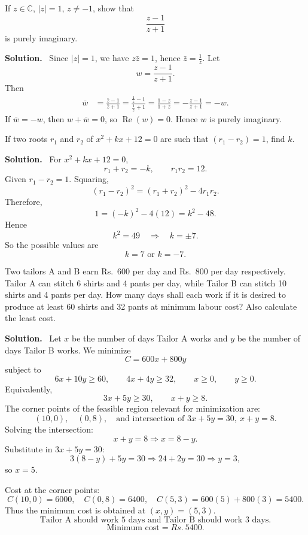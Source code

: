 \documentclass[11pt,a4paper]{article}
\newcommand{\question}[2]{\begin{tcolorbox}[breakable,colback=gray!5,colframe=black!35,title=\textbf{Question #1}]#2\end{tcolorbox}}
\newcommand{\answer}{\textbf{Solution.}\ }
\newcommand{\C}{\mathbb{C}}
\newcommand{\Rs}{Rs.}
\begin{document}
\question{1(e)}{If $z\in\C$, $|z|=1$, $z\ne -1$, show that
\[
\frac{z-1}{z+1}
\]
is purely imaginary.}
\answer
Since $|z|=1$, we have $z\bar z=1$, hence $\bar z=\frac1z$. Let
\[
w=\frac{z-1}{z+1}.
\]
Then
\begin{align*}
\bar w&=\frac{\bar z-1}{\bar z+1}
=\frac{\frac1z-1}{\frac1z+1}
=\frac{1-z}{1+z}
=-\frac{z-1}{z+1}=-w.
\end{align*}
If $\bar w=-w$, then $w+\bar w=0$, so $\operatorname{Re}(w)=0$. Hence $w$ is purely imaginary.

\question{1(f)}{If two roots $r_1$ and $r_2$ of $x^2+kx+12=0$ are such that $(r_1-r_2)=1$, find $k$.}
\answer
For $x^2+kx+12=0$,
\[
r_1+r_2=-k,\qquad r_1r_2=12.
\]
Given $r_1-r_2=1$. Squaring,
\[
(r_1-r_2)^2=(r_1+r_2)^2-4r_1r_2.
\]
Therefore,
\[
1=(-k)^2-4(12)=k^2-48.
\]
Hence
\[
k^2=49\quad\Rightarrow\quad k=\pm 7.
\]
So the possible values are
\[
\boxed{k=7\text{ or }k=-7.}
\]

\question{1(g)}{Two tailors A and B earn \Rs\ 600 per day and \Rs\ 800 per day respectively. Tailor A can stitch 6 shirts and 4 pants per day, while Tailor B can stitch 10 shirts and 4 pants per day. How many days shall each work if it is desired to produce at least 60 shirts and 32 pants at minimum labour cost? Also calculate the least cost.}
\answer
Let $x$ be the number of days Tailor A works and $y$ be the number of days Tailor B works. We minimize
\[
C=600x+800y
\]
subject to
\[
6x+10y\ge 60,
\qquad 4x+4y\ge 32,
\qquad x\ge0,
\qquad y\ge0.
\]
Equivalently,
\[
3x+5y\ge30,
\qquad x+y\ge8.
\]
The corner points of the feasible region relevant for minimization are:
\[
(10,0),\quad (0,8),\quad \text{and intersection of }3x+5y=30,\ x+y=8.
\]
Solving the intersection:
\[
x+y=8\Rightarrow x=8-y.
\]
Substitute in $3x+5y=30$:
\[
3(8-y)+5y=30\Rightarrow 24+2y=30\Rightarrow y=3,
\]
so $x=5$.

Cost at the corner points:
\[
C(10,0)=6000,
\quad C(0,8)=6400,
\quad C(5,3)=600(5)+800(3)=5400.
\]
Thus the minimum cost is obtained at $(x,y)=(5,3)$.
\[
\boxed{\text{Tailor A should work 5 days and Tailor B should work 3 days.}}
\]
\[
\boxed{\text{Minimum cost}=\Rs\ 5400.}
\]

\begin{center}
\end{center}
\end{document}
